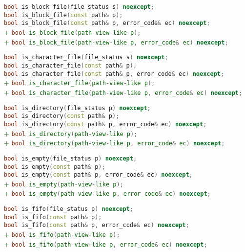 \documentclass[11pt]{article}
\newcommand{\code}[2][cpp]{\lstinline[language=#1,basicstyle=\small\ttfamily]{#2}}
\newcommand{\tsreplace}[3]{\textcolor{red}{\sout{#1}}#2\textcolor{darkgreen}{#3}}
\begin{document}
\tsreplace{}{  \code{bool is_block_file(file_status s) noexcept;}}{}\\
\tsreplace{}{  \code{bool is_block_file(const path& p);}}{}\\
\tsreplace{}{  \code{bool is_block_file(const path& p, error_code& ec) noexcept;}}{}\\
\tsreplace{}{}{+ \code{bool is_block_file(path-view-like p);}}\\
\tsreplace{}{}{+ \code{bool is_block_file(path-view-like p, error_code& ec) noexcept;}}

\tsreplace{}{  \code{bool is_character_file(file_status s) noexcept;}}{}\\
\tsreplace{}{  \code{bool is_character_file(const path& p);}}{}\\
\tsreplace{}{  \code{bool is_character_file(const path& p, error_code& ec) noexcept;}}{}\\
\tsreplace{}{}{+ \code{bool is_character_file(path-view-like p);}}\\
\tsreplace{}{}{+ \code{bool is_character_file(path-view-like p, error_code& ec) noexcept;}}

\tsreplace{}{  \code{bool is_directory(file_status p) noexcept;}}{}\\
\tsreplace{}{  \code{bool is_directory(const path& p);}}{}\\
\tsreplace{}{  \code{bool is_directory(const path& p, error_code& ec) noexcept;}}{}\\
\tsreplace{}{}{+ \code{bool is_directory(path-view-like p);}}\\
\tsreplace{}{}{+ \code{bool is_directory(path-view-like p, error_code& ec) noexcept;}}

\tsreplace{}{  \code{bool is_empty(file_status p) noexcept;}}{}\\
\tsreplace{}{  \code{bool is_empty(const path& p);}}{}\\
\tsreplace{}{  \code{bool is_empty(const path& p, error_code& ec) noexcept;}}{}\\
\tsreplace{}{}{+ \code{bool is_empty(path-view-like p);}}\\
\tsreplace{}{}{+ \code{bool is_empty(path-view-like p, error_code& ec) noexcept;}}

\tsreplace{}{  \code{bool is_fifo(file_status p) noexcept;}}{}\\
\tsreplace{}{  \code{bool is_fifo(const path& p);}}{}\\
\tsreplace{}{  \code{bool is_fifo(const path& p, error_code& ec) noexcept;}}{}\\
\tsreplace{}{}{+ \code{bool is_fifo(path-view-like p);}}\\
\tsreplace{}{}{+ \code{bool is_fifo(path-view-like p, error_code& ec) noexcept;}}
\end{document}
